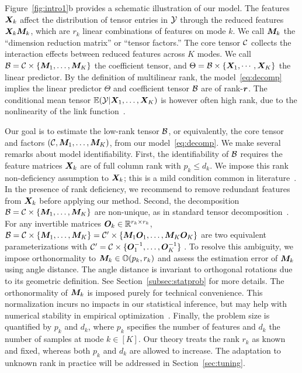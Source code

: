 \documentclass[12pt]{article}
\theoremstyle{definition}
\theoremstyle{definition}
\begin{document}
Figure~\ref{fig:intro1}b provides a schematic illustration of our model. The features $\bm X_k$ affect the distribution of tensor entries in $\mathcal{Y}$ through the reduced features $\bm X_k\bm M_k$, which are $r_k$ linear combinations of features on mode $k$. We call $\bm M_k$ the ``dimension reduction matrix'' or ``tensor factors.'' The core tensor $\mathcal{C}$ collects the interaction effects between reduced features across $K$ modes. We call $\mathcal{B}=\mathcal{C}\times\{\bm M_1,\ldots,\bm M_K\}$ the coefficient tensor, and $\Theta=\mathcal{B}\times\{\bm X_1,\cdots,\bm X_K\}$ the linear predictor. By the definition of multilinear rank, the model~\eqref{eq:decomp} implies the linear predictor $\Theta$ and coefficient tensor $\mathcal{B}$ are of rank-$\bm{r}$. The conditional mean tensor $\mathbb{E}(\mathcal{Y}|\bm X_1,\ldots,\bm X_K)$ is however often high rank, due to the nonlinearity of the link function~\citep{lee2021beyond}. 

Our goal is to estimate the low-rank tensor $\mathcal{B}$, or equivalently, the core tensor and factors $(\mathcal{C}, \bm M_1,\ldots,\bm M_K)$, from our model~\eqref{eq:decomp}. {  We make several remarks about model identifiability. First, the identifiability of $\mathcal{B}$ requires the feature matrices $\bm X_k$ are of full column rank with $p_k\leq d_k$. We impose this rank non-deficiency assumption to $\bm X_k$; this is a mild condition common in literature~\citep{lock2018supervised, li2017parsimonious, li2020generalized}. In the presence of rank deficiency, we recommend to remove redundant features from $\bm X_k$ before applying our method. Second, the decomposition $\mathcal{B} = \mathcal{C}\times\{\bm M_1,\ldots,\bm M_K\}$ are non-unique, as in standard tensor decomposition~\citep{kolda2009tensor}. For any invertible matrices $\bm{O}_k\in\mathbb{R}^{r_k\times r_k}$, $\mathcal{B}=\mathcal{C}\times\{\bm M_1,\ldots,\bm M_K\}=\mathcal{C}'\times\{\bm M_1\bm{O}_1,\ldots,\bm M_K\bm{O}_K\}$ are two equivalent parameterizations with $\mathcal{C}'=\mathcal{C}\times\{\bm{O}^{-1}_1,\ldots,\bm{O}^{-1}_K\}$ . To resolve this ambiguity, we impose orthonormality to $\bm M_k\in\mathbb{O}(p_k,r_k)$ and assess the estimation error of $\bm M_k$ using angle distance. The angle distance is invariant to orthogonal rotations due to its geometric definition. See Section~\ref{subsec:statprob} for more details. The orthonormality of $\bm M_k$ is imposed purely for technical convenience. This normalization incurs no impacts in our statistical inference, but may help with numerical stability in empirical optimization~\citep{de2000multilinear, kolda2009tensor}.} Finally, the problem size is quantified by $p_k$ and $d_k$, where $p_k$ specifies the number of features and $d_k$ the number of samples at mode $k\in[K]$. Our theory treats the rank $r_k$ as known and fixed, whereas both $p_k$ and $d_k$ are allowed to increase. The adaptation to unknown rank in practice will be addressed in Section~\ref{sec:tuning}. 
\end{document}
